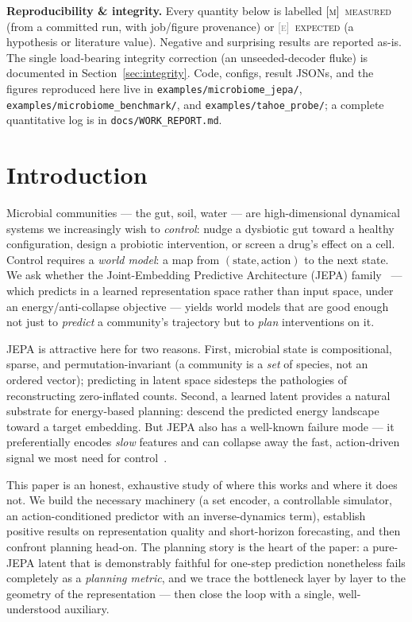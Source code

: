 \documentclass[11pt]{article}
\newcommand{\meas}{\textcolor{black}{\textsc{[m]}}}      %
\newcommand{\expd}{\textcolor{gray}{\textsc{[e]}}}       %
\newcommand{\code}[1]{\texttt{#1}}
\begin{document}
\noindent\textbf{Reproducibility \& integrity.} Every quantity below is labelled
\meas\ \textsc{measured} (from a committed run, with job/figure provenance) or
\expd\ \textsc{expected} (a hypothesis or literature value). Negative and
surprising results are reported as-is. The single load-bearing integrity
correction (an unseeded-decoder fluke) is documented in
Section~\ref{sec:integrity}. Code, configs, result JSONs, and the figures
reproduced here live in \code{examples/microbiome\_jepa/},
\code{examples/microbiome\_benchmark/}, and \code{examples/tahoe\_probe/}; a
complete quantitative log is in \code{docs/WORK\_REPORT.md}.

\section{Introduction}

Microbial communities --- the gut, soil, water --- are high-dimensional dynamical
systems we increasingly wish to \emph{control}: nudge a dysbiotic gut toward a
healthy configuration, design a probiotic intervention, or screen a drug's
effect on a cell. Control requires a \emph{world model}: a map from
$(\text{state},\text{action})$ to the next state. We ask whether the
Joint-Embedding Predictive Architecture (JEPA) family~\cite{lecun2022path}
--- which predicts in a learned representation space rather than input space,
under an energy/anti-collapse objective --- yields world models that are good
enough not just to \emph{predict} a community's trajectory but to \emph{plan}
interventions on it.

JEPA is attractive here for two reasons. First, microbial state is
compositional, sparse, and permutation-invariant (a community is a \emph{set}
of species, not an ordered vector); predicting in latent space sidesteps the
pathologies of reconstructing zero-inflated counts. Second, a learned latent
provides a natural substrate for energy-based planning: descend the predicted
energy landscape toward a target embedding. But JEPA also has a well-known
failure mode --- it preferentially encodes \emph{slow} features and can collapse
away the fast, action-driven signal we most need for control~\cite{sobal2022}.

This paper is an honest, exhaustive study of where this works and where it does
not. We build the necessary machinery (a set encoder, a controllable simulator,
an action-conditioned predictor with an inverse-dynamics term), establish
positive results on representation quality and short-horizon forecasting, and
then confront planning head-on. The planning story is the heart of the paper: a
pure-JEPA latent that is demonstrably faithful for one-step prediction
nonetheless fails completely as a \emph{planning metric}, and we trace the
bottleneck layer by layer to the geometry of the representation --- then close
the loop with a single, well-understood auxiliary.
\end{document}
